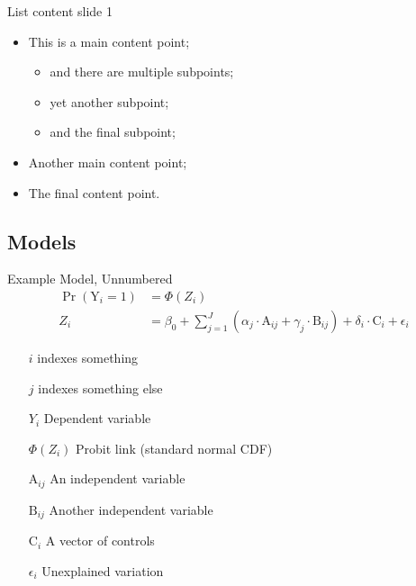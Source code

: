 \documentclass[usenames,dvipsnames]{beamer}
\begin{document}
\begin{frame}{List content slide 1}
    \begin{itemize}
        \item This is a main content point;
        \begin{itemize}
            \item and there are multiple subpoints;
            \item yet another subpoint;
            \item and the final subpoint;
        \end{itemize}
        \item Another main content point;
        \item The final content point. 
    \end{itemize}
\end{frame}

\subsection{Models}

\begin{frame}{Example Model, Unnumbered} %
    \begin{align*} %
        \Pr(\text{Y}_{i} = 1) &= \Phi(Z_i) \\
        Z_i &=\beta_0 + \sum_{j=1}^J\left(\alpha_j\cdot\text{A}_{ij} + \gamma_j\cdot\text{B}_{ij} \right)+\delta_{i}\cdot\text{C}_{i}+\epsilon_{i}
    \end{align*}
    \begin{itemize}
        \begin{itemize}
            \item [$i$] indexes something
            \item [$j$] indexes something else
        \end{itemize}
        \begin{itemize}
            \item [$Y_i$] Dependent variable
            \item [$\Phi(Z_i)$] Probit link (standard normal CDF)
            \item [$\text{A}_{ij}$] An independent variable
            \item [$\text{B}_{ij}$] Another independent variable
            \item [$\text{C}_{i}$] A vector of controls
            \item [$\epsilon_{i}$] Unexplained variation
        \end{itemize}
    \end{itemize}
\end{frame}
\end{document}
